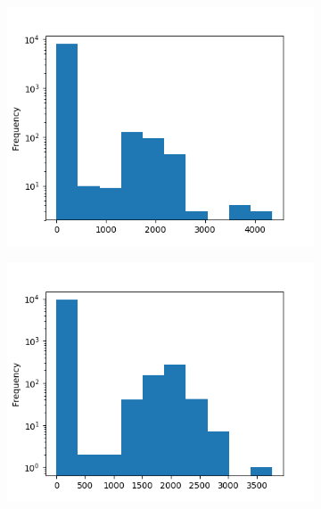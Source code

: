 \begin{figure}[!ht]
    \caption{Interest earned histograms.}
    \label{fig:interest-earned-hist}

    \begin{subfigure}[ht]{.5\linewidth}
        \centering
        \includegraphics[width=\textwidth]{./img/interest-earned-original.png}
    \end{subfigure}
    \begin{subfigure}[ht]{.5\linewidth}
        \centering
        \includegraphics[width=\textwidth]{./img/interest-earned-new.png}
    \end{subfigure}


\end{figure}
